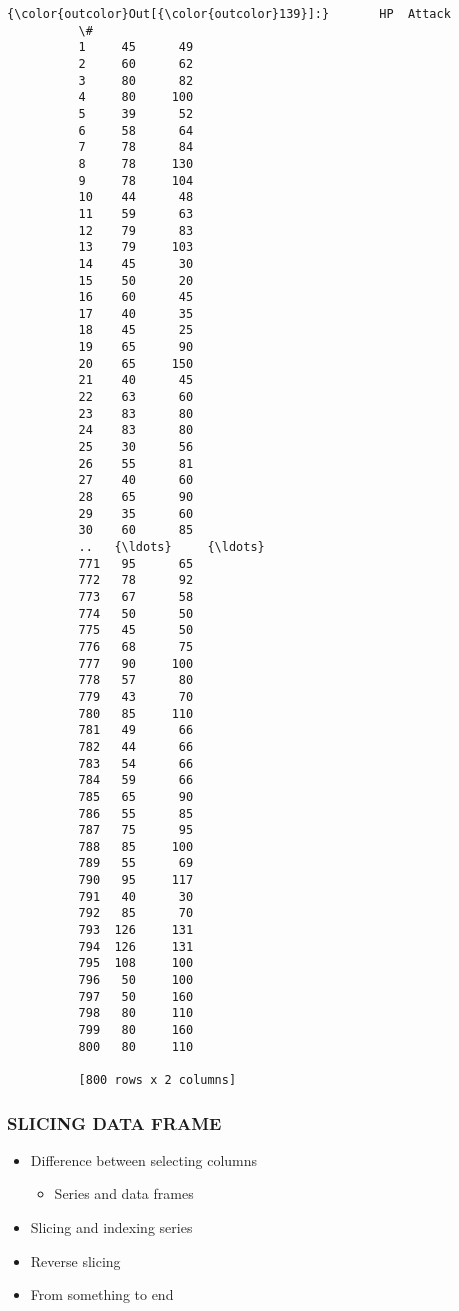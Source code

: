 \documentclass[11pt]{article}
\providecommand{\tightlist}{%
      \setlength{\itemsep}{0pt}\setlength{\parskip}{0pt}}
\begin{document}
\begin{Verbatim}[commandchars=\\\{\}]
{\color{outcolor}Out[{\color{outcolor}139}]:}       HP  Attack
          \#               
          1     45      49
          2     60      62
          3     80      82
          4     80     100
          5     39      52
          6     58      64
          7     78      84
          8     78     130
          9     78     104
          10    44      48
          11    59      63
          12    79      83
          13    79     103
          14    45      30
          15    50      20
          16    60      45
          17    40      35
          18    45      25
          19    65      90
          20    65     150
          21    40      45
          22    63      60
          23    83      80
          24    83      80
          25    30      56
          26    55      81
          27    40      60
          28    65      90
          29    35      60
          30    60      85
          ..   {\ldots}     {\ldots}
          771   95      65
          772   78      92
          773   67      58
          774   50      50
          775   45      50
          776   68      75
          777   90     100
          778   57      80
          779   43      70
          780   85     110
          781   49      66
          782   44      66
          783   54      66
          784   59      66
          785   65      90
          786   55      85
          787   75      95
          788   85     100
          789   55      69
          790   95     117
          791   40      30
          792   85      70
          793  126     131
          794  126     131
          795  108     100
          796   50     100
          797   50     160
          798   80     110
          799   80     160
          800   80     110
          
          [800 rows x 2 columns]
\end{Verbatim}
            
    \hypertarget{slicing-data-frame}{%
\subsubsection{SLICING DATA FRAME}\label{slicing-data-frame}}

\begin{itemize}
\tightlist
\item
  Difference between selecting columns

  \begin{itemize}
  \tightlist
  \item
    Series and data frames
  \end{itemize}
\item
  Slicing and indexing series
\item
  Reverse slicing
\item
  From something to end
\end{itemize}
\end{document}
